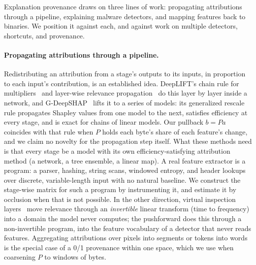 
Explanation provenance draws on three lines of work: propagating attributions through a pipeline, explaining malware detectors, and mapping features back to binaries. We position it against each, and against work on multiple detectors, shortcuts, and provenance.

\paragraph{Propagating attributions through a pipeline.} Redistributing an attribution from a stage's outputs to its inputs, in proportion to each input's contribution, is an established idea. DeepLIFT's chain rule for multipliers~\cite{shrikumar2017learning} and layer-wise relevance propagation~\cite{bach2015pixel} do this layer by layer inside a network, and G-DeepSHAP~\cite{chen2022explaining} lifts it to a series of models: its generalized rescale rule propagates Shapley values from one model to the next, satisfies efficiency at every stage, and is exact for chains of linear models. Our pullback $b = Pa$ coincides with that rule when $P$ holds each byte's share of each feature's change, and we claim no novelty for the propagation step itself. What these methods need is that every stage be a model with its own efficiency-satisfying attribution method (a network, a tree ensemble, a linear map). A real feature extractor is a program: a parser, hashing, string scans, windowed entropy, and header lookups over discrete, variable-length input with no natural baseline. We construct the stage-wise matrix for such a program by instrumenting it, and estimate it by occlusion when that is not possible. In the other direction, virtual inspection layers~\cite{vielhaben2024explainable} move relevance through an \emph{invertible} linear transform (time to frequency) into a domain the model never computes; the pushforward does this through a non-invertible program, into the feature vocabulary of a detector that never reads features. Aggregating attributions over pixels into segments or tokens into words~\cite{jullum2021groupshapley} is the special case of a 0/1 provenance within one space, which we use when coarsening $P$ to windows of bytes.

